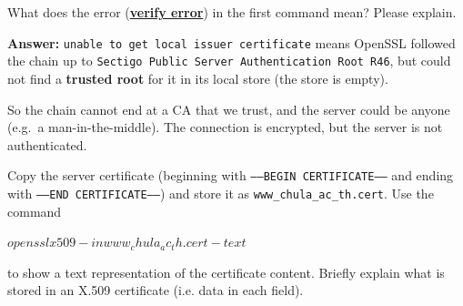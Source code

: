 \documentclass[a4paper, 10pt]{article}
\begin{document}
\begin{problem}
	What does the error (\textbf{\underline{verify error}}) in the first command mean?
	Please explain.
\end{problem}

\begin{solution}
	\noindent \textbf{Answer:} \texttt{unable to get local issuer certificate} means OpenSSL followed the chain up to
	\texttt{Sectigo Public Server Authentication Root R46}, but could not find a \textbf{trusted root} for it in its local store (the store is empty).

	So the chain cannot end at a CA that we trust, and the server could be anyone (e.g.\ a man-in-the-middle).
	The connection is encrypted, but the server is not authenticated.
\end{solution}

\newpage

\begin{problem}
	Copy the server certificate
	(beginning with \texttt{-----BEGIN CERTIFICATE-----} and ending with \texttt{-----END CERTIFICATE-----})
	and store it as \texttt{www\_chula\_ac\_th.cert}.
	Use the command
	\begin{codingbox}[language=bash]
$ openssl x509 -in www_chula_ac_th.cert -text
$
\end{codingbox}
	\noindent to show a text representation of the certificate content.
	Briefly explain what is stored in an X.509 certificate (i.e. data in each field).
\end{problem}
\end{document}
